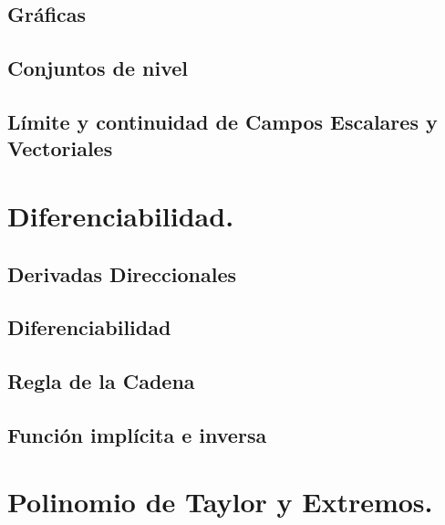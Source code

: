 \documentclass{report}
\begin{document}
  


\section{Gráficas}

         



            
\section{Conjuntos de nivel}

       
  
  
         
 \section{L\'imite y continuidad de Campos Escalares y Vectoriales}
 
       

  
          
\chapter{Diferenciabilidad.} 
          \section{Derivadas Direccionales}
       
            
 
\section{Diferenciabilidad}

 
\section{Regla de la Cadena}
 



\section{Funci\'on impl\'icita e inversa}    
   
      

 \chapter{Polinomio de Taylor y Extremos.}
\end{document}
